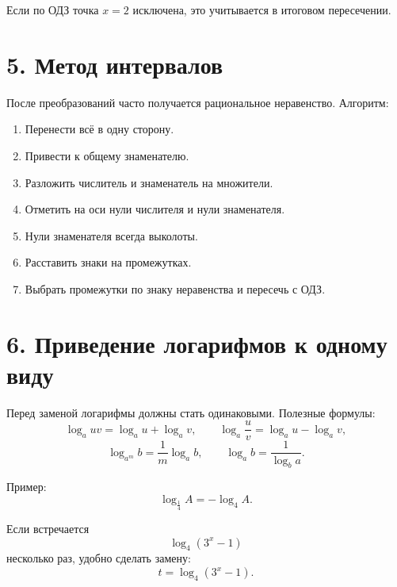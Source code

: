 \documentclass[a4paper,12pt]{article}
\begin{document}
Если по ОДЗ точка \(x=2\) исключена, это учитывается в итоговом пересечении.

\section*{5. Метод интервалов}

После преобразований часто получается рациональное неравенство. Алгоритм:

\begin{enumerate}
\item Перенести всё в одну сторону.
\item Привести к общему знаменателю.
\item Разложить числитель и знаменатель на множители.
\item Отметить на оси нули числителя и нули знаменателя.
\item Нули знаменателя всегда выколоты.
\item Расставить знаки на промежутках.
\item Выбрать промежутки по знаку неравенства и пересечь с ОДЗ.
\end{enumerate}

\begin{center}
\end{center}

\section*{6. Приведение логарифмов к одному виду}

Перед заменой логарифмы должны стать одинаковыми. Полезные формулы:
\[
\log_a uv=\log_a u+\log_a v,
\qquad
\log_a \frac{u}{v}=\log_a u-\log_a v,
\]
\[
\log_{a^m} b=\frac{1}{m}\log_a b,
\qquad
\log_a b=\frac{1}{\log_b a}.
\]

Пример:
\[
\log_{\frac14} A=-\log_4 A.
\]

Если встречается
\[
\log_4(3^x-1)
\]
несколько раз, удобно сделать замену:
\[
t=\log_4(3^x-1).
\]
\end{document}
